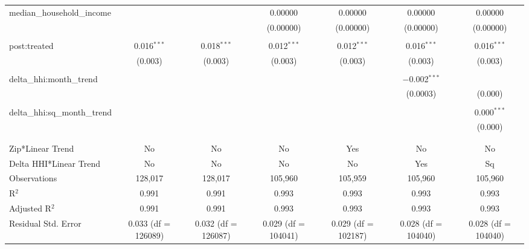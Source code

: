 \begin{table}[H]
{\begin{tabular}{@{\extracolsep{5pt}}lcccccc}
  median\_household\_income &  &  & 0.00000 & 0.00000 & 0.00000 & 0.00000 \\  

   &  &  & (0.00000) & (0.00000) & (0.00000) & (0.00000) \\  

   & & & & & & \\  

  post:treated & 0.016$^{***}$ & 0.018$^{***}$ & 0.012$^{***}$ & 0.012$^{***}$ & 0.016$^{***}$ & 0.016$^{***}$ \\  

   & (0.003) & (0.003) & (0.003) & (0.003) & (0.003) & (0.003) \\  

   & & & & & & \\  

  delta\_hhi:month\_trend &  &  &  &  & $-$0.002$^{***}$ &  \\  

   &  &  &  &  & (0.0003) & (0.000) \\  

   & & & & & & \\  

  delta\_hhi:sq\_month\_trend &  &  &  &  &  & 0.000$^{***}$ \\  

   &  &  &  &  &  & (0.000) \\  

   & & & & & & \\  

 \hline \\[-1.8ex]  

 Zip*Linear Trend & No & No & No & Yes & No & No \\  

 Delta HHI*Linear Trend & No & No & No & No & Yes & Sq \\  

 Observations & 128,017 & 128,017 & 105,960 & 105,959 & 105,960 & 105,960 \\  

 R$^{2}$ & 0.991 & 0.991 & 0.993 & 0.993 & 0.993 & 0.993 \\  

 Adjusted R$^{2}$ & 0.991 & 0.991 & 0.993 & 0.993 & 0.993 & 0.993 \\  

 Residual Std. Error & 0.033 (df = 126089) & 0.032 (df = 126087) & 0.029 (df = 104041) & 0.029 (df = 102187) & 0.028 (df = 104040) & 0.028 (df = 104040) \\  


\end{tabular}}
\end{table}
